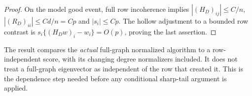 \begin{proof}
On the model good event, full row incoherence implies
$|(H_D)_{ij}|\le C/n$, $|(R_D)_{ii}|\le Cd/n=Cp$ and
$|s_i|\le Cp$. The hollow adjustment to a bounded row contrast is
$s_i\{(H_Dw)_i-w_i\}=O(p)$, proving the last assertion.
\end{proof}

The result compares the \emph{actual} full-graph normalized algorithm to
a row-independent score, with its changing degree normalizers included.
It does not treat a full-graph eigenvector as independent of the row that
created it. This is the dependence step needed before any conditional
sharp-tail argument is applied.
